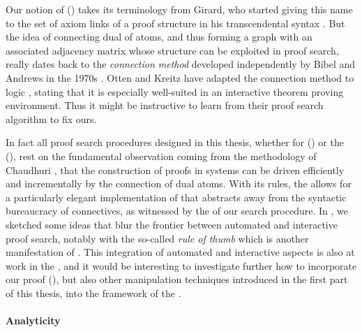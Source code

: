 \begin{scope}
Our notion of \emph{} () takes its terminology from
Girard, who started giving this name to the set of axiom links of a proof
structure in his transcendental syntax . But the idea of connecting dual
 of atoms, and thus forming a graph with an associated adjacency
matrix whose structure can be exploited in proof search, really dates back to
the \emph{connection method} developed independently by Bibel and Andrews in the
1970s . Otten and Kreitz have adapted the connection method
to  logic , stating that it is
especially well-suited in an interactive theorem proving environment. Thus it
might be instructive to learn from their proof search algorithm to fix ours.

In fact all proof search procedures designed in this thesis, whether for  () or the 
(), rest on the fundamental observation coming from the
 methodology of Chaudhuri , that the
construction of proofs in  systems can be driven efficiently and
incrementally by the connection of dual atoms. With its  rules, the
 allows for a particularly elegant implementation of  that abstracts away from the syntactic bureaucracy of 
connectives, as witnessed by the  of our search procedure. In
, we sketched some ideas that blur the frontier
between automated and interactive proof search, notably with the so-called
\emph{rule of thumb} which is another manifestation of . This
integration of automated and interactive aspects is also at work in the , and it would be interesting to investigate further how to incorporate
our  proof  (), but also other 
manipulation techniques introduced in the first part of this thesis, into the
 framework of the .

\paragraph{Analyticity}


\end{scope}
